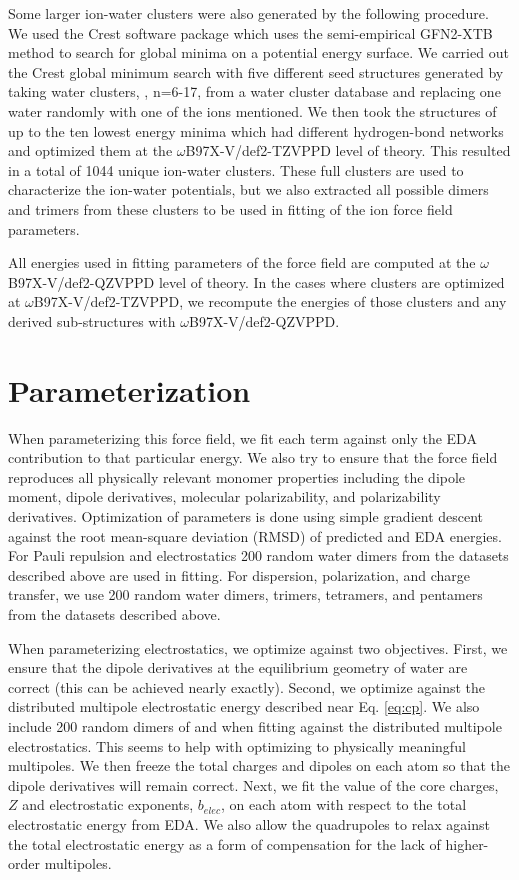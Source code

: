 \documentclass[journal=jacsat,manuscript=article]{achemso}
\begin{document}
Some larger ion-water clusters were also generated by the following procedure.
We used the Crest software package\cite{pracht2020automated} which uses the semi-empirical GFN2-XTB\cite{bannwarth2019gfn2}
method to search for global minima on a potential energy surface. We carried out the Crest global minimum
search with five different seed structures generated by taking water clusters, , n=6-17, from a
water cluster database\cite{rakshit2019atlas} and replacing one water randomly with one of the ions mentioned.
We then took the structures of up to the ten lowest energy minima which had different hydrogen-bond
networks and optimized them at the $\omega$B97X-V/def2-TZVPPD level of theory. This resulted in a total
of 1044 unique ion-water clusters. These full clusters
are used to characterize the ion-water potentials, but we also extracted all possible dimers
and trimers from these clusters to be used in fitting of the ion force field parameters.

All energies used in fitting parameters of the force field are computed
at the $\omega$B97X-V/def2-QZVPPD level of theory. In the cases where clusters are optimized at
$\omega$B97X-V/def2-TZVPPD, we recompute the energies of those clusters and any derived sub-structures
with $\omega$B97X-V/def2-QZVPPD.

\section*{Parameterization}

When parameterizing this force field, we fit each term against only the EDA contribution
to that particular energy. We also try to ensure that the force field reproduces
all physically relevant monomer properties including the dipole moment, dipole derivatives,
molecular polarizability, and polarizability derivatives. Optimization of parameters is done using simple gradient descent
against the root mean-square deviation (RMSD) of predicted and EDA energies.
For Pauli repulsion and electrostatics 200 random water dimers from the datasets
described above are used in fitting. For dispersion, polarization, and charge transfer, we use
200 random water dimers, trimers, tetramers, and pentamers from the datasets described above.

When parameterizing electrostatics, we optimize against two objectives. First, we ensure
that the dipole derivatives at the equilibrium geometry of water are correct (this can be achieved
nearly exactly). Second, we optimize against the distributed multipole electrostatic energy described
near Eq. \ref{eq:cp}. We also include 200 random dimers
of  and  when fitting against the distributed multipole electrostatics.
This seems to help with optimizing to physically meaningful multipoles.
We then freeze the total charges and dipoles on each atom so that the dipole derivatives
will remain correct. Next, we fit the value of the core charges, $Z$ and electrostatic exponents, $b_{elec}$, on each atom
with respect to the total electrostatic energy from EDA. We also allow the quadrupoles to relax
against the total electrostatic energy as a form of compensation for the lack of higher-order multipoles.
\end{document}
